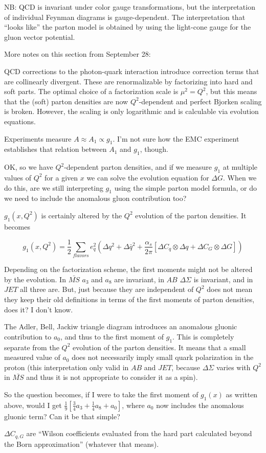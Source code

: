 NB: QCD is invariant under color gauge transformations, but the interpretation of individual Feynman diagrams is gauge-dependent.  The interpretation that ``looks like'' the parton model is obtained by using the light-cone gauge for the gluon vector potential.

More notes on this section from September 28:

QCD corrections to the photon-quark interaction introduce correction terms that are collinearly divergent.  These are renormalizable by factorizing into hard and soft parts.  The optimal choice of a factorization scale is $\mu^2 = Q^2$, but this means that the (soft) parton densities are now $Q^2$-dependent and perfect Bjorken scaling is broken.  However, the scaling is only logarithmic and is calculable via evolution equations.

Experiments measure $A \approx A_1 \propto g_1$.  I'm not sure how the EMC experiment establishes that relation between $A_1$ and $g_1$, though.

OK, so we have $Q^2$-dependent parton densities, and if we measure $g_1$ at multiple values of $Q^2$ for a given $x$ we can solve the evolution equation for $\Delta G$.  When we do this, are we still interpreting $g_1$ using the simple parton model formula, or do we need to include the anomalous gluon contribution too?

$g_1(x, Q^2)$ is certainly altered by the $Q^2$ evolution of the parton densities.  It becomes

\begin{equation}
  g_1(x, Q^2) = \frac{1}{2} \sum_{flavors} e_q^2 \left(\Delta q^2 + \Delta \bar{q}^2 + \frac{\alpha_s}{2 \pi} \left[\Delta C_q \otimes \Delta q + \Delta C_G \otimes \Delta G\right]\right)
\end{equation}

Depending on the factorization scheme, the first moments might not be altered by the evolution. In $\bar{MS}$ $a_3$ and $a_8$ are invariant, in $AB$ $\Delta \Sigma$ is invariant, and in $JET$ all three are.  But, just because they are independent of $Q^2$ does not mean they keep their old definitions in terms of the first moments of parton densities, does it?  I don't know.

The Adler, Bell, Jackiw triangle diagram introduces an anomalous gluonic contribution to $a_0$, and thus to the first moment of $g_1$.  This is completely separate from the $Q^2$ evolution of the parton densities.  It means that a small measured value of $a_0$ does not necessarily imply small quark polarization in the proton (this interpretation only valid in $AB$ and $JET$, because $\Delta \Sigma$ varies with $Q^2$ in $\bar{MS}$ and thus it is not appropriate to consider it as a spin).

So the question becomes, if I were to take the first moment of $g_1(x)$ as written above, would I get $\frac{1}{9}\left[\frac{3}{4}a_3+\frac{1}{4}a_8 + a_0\right]$, where $a_0$ now includes the anomalous gluonic term?  Can it be that simple?

$\Delta C_{q,G}$ are ``Wilson coefficients evaluated from the hard part calculated beyond the Born approximation'' (whatever that means).
